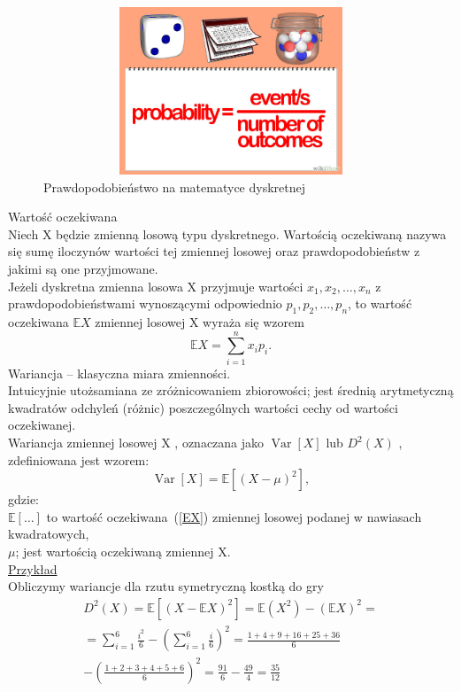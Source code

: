 \documentclass[10pt,a4paper]{report}
\begin{document}
\begin{figure}[t]
\includegraphics[width=15cm, height=5cm]{Prob}
Prawdopodobieństwo na matematyce dyskretnej
\end{figure}
Warto\'sć oczekiwana\\
Niech X będzie zmienną losową typu dyskretnego. Wartością oczekiwaną nazywa się sumę iloczynów wartości tej zmiennej losowej oraz prawdopodobieństw z jakimi są one przyjmowane.\\
Jeżeli dyskretna zmienna losowa X przyjmuje wartości $x_1, x_2, \dots, x_n$ z prawdopodobieństwami wynoszącymi odpowiednio $p_1, p_2, \dots, p_n$, to wartość oczekiwana $\mathbb EX$ zmiennej losowej X wyraża się wzorem
\begin{equation}\label{EX}
\mathbb EX = \sum_{i=1}^n x_i p_i.
\end{equation}
Wariancja – klasyczna miara zmienności.\\
 Intuicyjnie utożsamiana ze zróżnicowaniem zbiorowości; jest średnią arytmetyczną kwadratów odchyleń (różnic) poszczególnych wartości cechy od wartości oczekiwanej.\\
Wariancja zmiennej losowej  X , oznaczana jako  $\operatorname{Var}[X]$  lub  $D^2 (X)$ , zdefiniowana jest wzorem:
\begin{equation*}
\operatorname{Var}[X]=\mathbb E[(X-\mu)^2],
\end{equation*}
gdzie:\\
$\mathbb E[\dots ]$ to warto\'sć oczekiwana~(\ref{EX}) zmiennej losowej podanej w nawiasach kwadratowych,\\
$\mu$; jest wartością oczekiwaną zmiennej X.\cite{Wariancja}\\
\underline{Przykład}\\
Obliczymy wariancje dla rzutu symetryczną kostką do gry\\
\begin{eqnarray*}
D^2(X)=\mathbb E[(X-\mathbb EX)^2]=\mathbb E(X^2)- (\mathbb EX)^2=\\
=\sum_{i=1}^{6}\frac{i^2}{6}-(\sum_{i=1}^{6}\frac{i}{6})^2=\frac{1+4+9+16+25+36}{6}\\
-(\frac{1+2+3+4+5+6}{6})^2=\frac{91}{6}-\frac{49}{4}=\frac{35}{12}
\end{eqnarray*}
\end{document}
